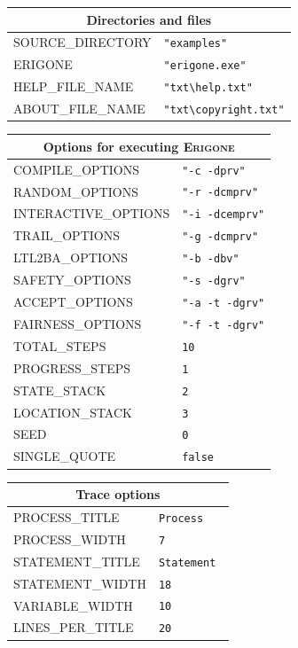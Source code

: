 \documentclass[11pt]{article}
\newcommand{\eri}{\textsc{Erigone}}
\begin{document}
\begin{center}

\begin{tabular}{|p{}|p{}|}
\hline
\multicolumn{2}{|c|}{Directories and files}\\ \hline
\textsc{\ttfamily SOURCE\_DIRECTORY} & \verb+"examples"+ \\
\textsc{\ttfamily ERIGONE} &\verb+"erigone.exe"+ \\
\textsc{\ttfamily HELP\_FILE\_NAME} &\verb+"txt\help.txt"+\\
\textsc{\ttfamily ABOUT\_FILE\_NAME} &\verb+"txt\copyright.txt"+\\
\hline
\end{tabular}

\bigskip

\begin{tabular}{|p{}|p{}|}
\hline
\multicolumn{2}{|c|}{Options for executing \eri{}}\\ \hline
\textsc{\ttfamily COMPILE\_OPTIONS} &\verb+"-c -dprv"+\\
\textsc{\ttfamily RANDOM\_OPTIONS} &\verb+"-r -dcmprv"+\\
\textsc{\ttfamily INTERACTIVE\_OPTIONS} &\verb+"-i -dcemprv"+\\
\textsc{\ttfamily TRAIL\_OPTIONS} &\verb+"-g -dcmprv"+\\
\textsc{\ttfamily LTL2BA\_OPTIONS} &\verb+"-b -dbv"+\\
\textsc{\ttfamily SAFETY\_OPTIONS} &\verb+"-s -dgrv"+\\
\textsc{\ttfamily ACCEPT\_OPTIONS} &\verb+"-a -t -dgrv"+\\
\textsc{\ttfamily FAIRNESS\_OPTIONS} &\verb+"-f -t -dgrv"+\\

\textsc{\ttfamily TOTAL\_STEPS} & \verb+10+\\
\textsc{\ttfamily PROGRESS\_STEPS} & \verb+1+\\
\textsc{\ttfamily STATE\_STACK} & \verb+2+\\
\textsc{\ttfamily LOCATION\_STACK} & \verb+3+\\
\textsc{\ttfamily SEED} & \verb+0+\\
\textsc{\ttfamily SINGLE\_QUOTE} & \verb+false+\\\hline
\end{tabular}

\bigskip

\begin{tabular}{|p{}|p{}|}
\hline
\multicolumn{2}{|c|}{Trace options}\\ \hline
\textsc{\ttfamily PROCESS\_TITLE} & \verb+Process +\\
\textsc{\ttfamily PROCESS\_WIDTH} & \verb+7+\\
\textsc{\ttfamily STATEMENT\_TITLE} & \verb+Statement +\\
\textsc{\ttfamily STATEMENT\_WIDTH} & \verb+18+\\
\textsc{\ttfamily VARIABLE\_WIDTH} &\verb+10+\\
\textsc{\ttfamily LINES\_PER\_TITLE} &\verb+20+\\
\hline
\end{tabular}


\end{center}
\end{document}
